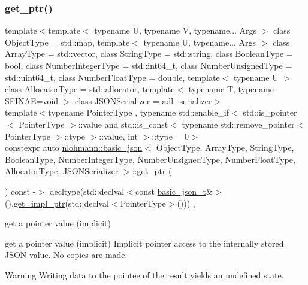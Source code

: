 \subsubsection{\texorpdfstring{get\+\_\+ptr()}{get\_ptr()}\hspace{0.1cm}{\footnotesize\ttfamily [2/2]}}
{\footnotesize\ttfamily template$<$template$<$ typename U, typename V, typename... Args $>$ class Object\+Type = std\+::map, template$<$ typename U, typename... Args $>$ class Array\+Type = std\+::vector, class String\+Type  = std\+::string, class Boolean\+Type  = bool, class Number\+Integer\+Type  = std\+::int64\+\_\+t, class Number\+Unsigned\+Type  = std\+::uint64\+\_\+t, class Number\+Float\+Type  = double, template$<$ typename U $>$ class Allocator\+Type = std\+::allocator, template$<$ typename T, typename S\+F\+I\+N\+A\+E=void $>$ class J\+S\+O\+N\+Serializer = adl\+\_\+serializer$>$ \\
template$<$typename Pointer\+Type , typename std\+::enable\+\_\+if$<$ std\+::is\+\_\+pointer$<$ Pointer\+Type $>$\+::value and std\+::is\+\_\+const$<$ typename std\+::remove\+\_\+pointer$<$ Pointer\+Type $>$\+::type $>$\+::value, int $>$\+::type  = 0$>$ \\
constexpr auto \mbox{\hyperlink{classnlohmann_1_1basic__json}{nlohmann\+::basic\+\_\+json}}$<$ Object\+Type, Array\+Type, String\+Type, Boolean\+Type, Number\+Integer\+Type, Number\+Unsigned\+Type, Number\+Float\+Type, Allocator\+Type, J\+S\+O\+N\+Serializer $>$\+::get\+\_\+ptr (\begin{DoxyParamCaption}{ }\end{DoxyParamCaption}) const -\/$>$ decltype(std\+::declval$<$const \mbox{\hyperlink{classnlohmann_1_1basic__json_afff7860310ae69f29f8158a77ec0ef13}{basic\+\_\+json\+\_\+t}}\&$>$().\mbox{\hyperlink{classnlohmann_1_1basic__json_a58b65f595883fb93333423ec5e3bafee}{get\+\_\+impl\+\_\+ptr}}(std\+::declval$<$Pointer\+Type$>$()))
    \hspace{0.3cm}{\ttfamily [inline]}, {\ttfamily [noexcept]}}



get a pointer value (implicit) 

get a pointer value (implicit) Implicit pointer access to the internally stored J\+S\+ON value. No copies are made.

\begin{DoxyWarning}{Warning}
Writing data to the pointee of the result yields an undefined state.
\end{DoxyWarning}


